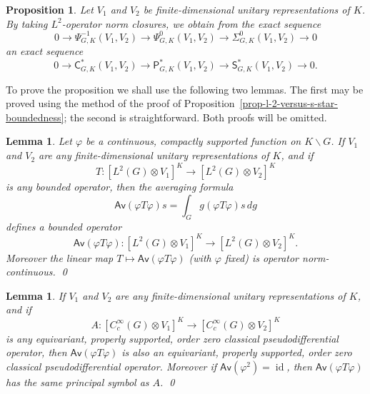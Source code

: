 \documentclass[leqno,11pt]{amsart}
\numberwithin{equation}{subsection}
\theoremstyle{plain}
\newtheorem{lemma}[equation]{Lemma}
\newtheorem{proposition}[equation]{Proposition}
\theoremstyle{definition}
\theoremstyle{remark}
\newcommand{\PSDO}{\mathsf{P}}
\newcommand{\CC}{\mathsf{C}}
\newcommand{\Symb}{\mathsf{S}}
\begin{document}
\begin{proposition}
\label{prop-order-zero-psdo-extension}
Let $V_1$ and $V_2$ be finite-dimensional unitary representations of $K$. By taking $L^2$-operator norm closures, we obtain from the exact sequence 
 \[
    0 \longrightarrow \Psi^{-1}_{G,K}(V_1,V_2) \longrightarrow \Psi^0_{G,K}(V_1,V_2) \longrightarrow \Sigma^0_{G,K} (V_1,V_2)  \longrightarrow 0
    \]
an exact sequence    
    \[
    0 \longrightarrow \CC^*_{G,K}(V_1,V_2) \longrightarrow \PSDO^*_{G,K}(V_1,V_2) \longrightarrow \Symb^*_{G,K} (V_1,V_2)  \longrightarrow 0 .
    \]
\end{proposition}

To prove the proposition we shall use the following two lemmas.  The first may be proved using the method of the proof of Proposition~\ref{prop-l-2-versus-s-star-boundedness}; the second is straightforward.  Both proofs will be omitted.

\begin{lemma}
\label{lem-continuity-of-averaging}
    Let $\varphi$   be a continuous, compactly supported function  on $K \backslash G$.  If $V_1$ and $V_2$ are any finite-dimensional unitary representations of $K$, and if 
    \[
    T \colon [L^2 ( G)\otimes V_1]^K 
    \longrightarrow 
    [L^2 ( G)\otimes V_2]^K 
    \]
    is any bounded operator, then the averaging formula 
    \[
    \mathsf{Av}(\varphi T \varphi )s = \int _G g( \varphi T \varphi)s \, dg
    \]
    defines a bounded operator 
     \[
       \mathsf{Av}(\varphi T \varphi )\colon [L^2 ( G )\otimes V_1]^K
    \longrightarrow 
   [L^2 ( G )\otimes V_2]^K .
    \]
   Moreover the linear map $T \mapsto \mathsf{Av}(\varphi T \varphi )$ \textup{(}with $\varphi$  fixed\textup{)} is operator norm-continuous. \qed
\end{lemma}

\begin{lemma}
\label{lem-averaged-operator-has-same-principal-symbol}
  If $V_1$ and $V_2$ are any finite-dimensional unitary representations of $K$, and if 
    \[
    A \colon [C_c^\infty  (G)\otimes   V_1]^K 
    \longrightarrow 
  [C_c^\infty  (G)\otimes   V_2]^K  
    \]
    is any equivariant, properly supported, order zero classical pseudodifferential  operator, then  
    $ \mathsf{Av}(\varphi T \varphi )$ is also an equivariant, properly supported, order zero classical pseudodifferential  operator. Moreover if $\mathsf{Av}( \varphi^2)=\operatorname{id}$, then   $ \mathsf{Av}(\varphi T \varphi )$ has  the same principal symbol as $A$. \qed
\end{lemma}
\end{document}
